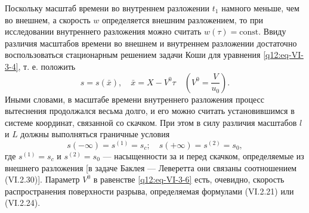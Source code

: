 Поскольку масштаб времени во внутреннем разложении $t_1$ намного меньше, чем во внешнем, а скорость $w$ определяется внешним разложением, то при исследовании внутреннего разложения можно считать $w(\tau)=\mathrm{const}$. Ввиду различия масштабов времени во внешнем и внутреннем разложении достаточно воспользоваться стационарным решением задачи Коши для уравнения \eqref{q12:eq-VI-3-4}, т. е. положить
\begin{equation}s=s(\bar x),\quad\bar x=X-V^0\tau\quad\left(V^0=\frac{V}{u_0}\right).\tag{VI.3.6}\label{q12:eq-VI-3-6}\end{equation}
Иными словами, в масштабе времени внутреннего разложения процесс вытеснения продолжался весьма долго, и его можно считать установившимся в системе координат, связанной со скачком. При этом в силу различия масштабов $l$ и $L$ должны выполняться граничные условия
\begin{equation}s(-\infty)=s^{(1)}=s_c;\quad s(+\infty)=s^{(2)}=s_0,\tag{VI.3.7}\label{q12:eq-VI-3-7}\end{equation}
где $s^{(1)}=s_c$ и $s^{(2)}=s_0$ --- насыщенности за и перед скачком, определяемые из внешнего разложения [в задаче Баклея --- Леверетта они связаны соотношением (VI.2.30)]. Параметр $V^0$ в равенстве \eqref{q12:eq-VI-3-6} есть, очевидно, скорость распространения поверхности разрыва, определяемая формулами (VI.2.21) или (VI.2.24).

